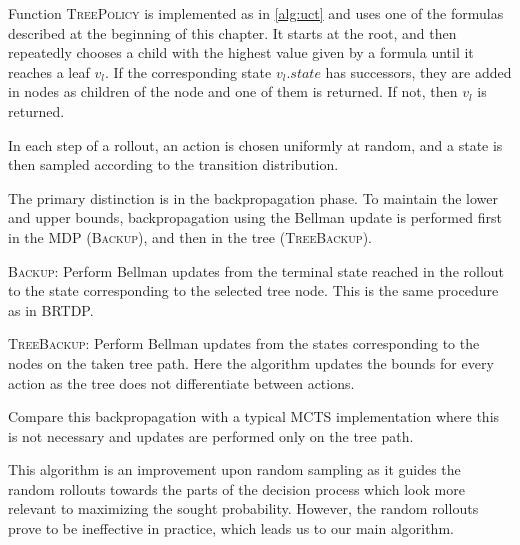 Function \textsc{TreePolicy} is implemented as in
\autoref{alg:uct} and uses one of the formulas
described at the beginning of this chapter. It starts at the root, and
then repeatedly chooses a child with the highest value given by a
formula until it reaches a leaf $v_l$. If the corresponding state
$v_l.state$ has successors, they are added in nodes as children of the
node and one of them is returned. If not, then $v_l$ is returned.

In each step of a rollout, an action is chosen
uniformly at random, and a state is then sampled according to the
transition distribution.

The primary distinction is in the backpropagation phase. To maintain the lower
and upper bounds, backpropagation using the Bellman update is performed
first in the MDP (\textsc{Backup}), and then in the tree (\textsc{TreeBackup}).

\textsc{Backup}: Perform Bellman updates from the terminal state reached in the
rollout to the state corresponding to the selected tree node. This is
the same procedure as in BRTDP.

\textsc{TreeBackup}: Perform Bellman updates from the states
corresponding to the nodes on the taken tree path. Here the algorithm
updates the bounds for every action as the tree does not differentiate
between actions.

Compare this backpropagation with a typical MCTS implementation where
this is not necessary and updates are performed only on the tree path.


This algorithm is an improvement upon random sampling as it guides the
random rollouts towards the parts of the decision process which look
more relevant to maximizing the sought probability. However, the random
rollouts prove to be ineffective in practice, which leads us to our main
algorithm.

\newpage

